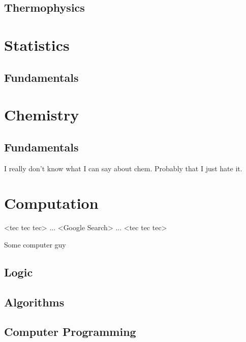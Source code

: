 \section{Thermophysics}

\chapter{Statistics}

\section{Fundamentals}

\chapter{Chemistry}

\section{Fundamentals}
I really don't know what I can say about chem. Probably that
I just hate it.

\chapter{Computation}

\epigraph{<tec tec tec> ... <Google Search> ... <tec tec tec>}{Some computer guy}

\section{Logic}
\section{Algorithms}
\section{Computer Programming}
